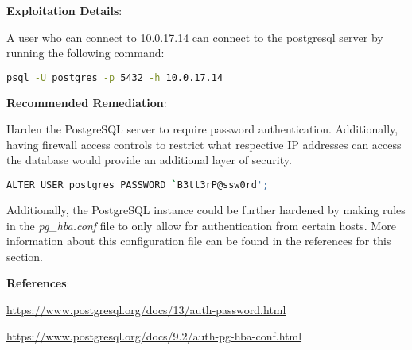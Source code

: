 \noindent
\textbf{Exploitation Details}:
    
    A user who can connect to 10.0.17.14 can connect to the postgresql server by running the following command:
    
\begin{lstlisting}[language=bash,frame=single,showstringspaces=false]
psql -U postgres -p 5432 -h 10.0.17.14
\end{lstlisting}


\noindent
\textbf{Recommended Remediation}:

    Harden the PostgreSQL server to require password authentication. Additionally, having firewall access controls to restrict what respective IP addresses can access the database would provide an additional layer of security.
    
\begin{lstlisting}[language=bash,frame=single,showstringspaces=false]
ALTER USER postgres PASSWORD `B3tt3rP@ssw0rd';
\end{lstlisting}

    Additionally, the PostgreSQL instance could be further hardened by making rules in the \textit{pg\_hba.conf} file to only allow for authentication from certain hosts. More information about this configuration file can be found in the references for this section.

\noindent
\textbf{References}:

    \url{https://www.postgresql.org/docs/13/auth-password.html}
    
    \url{https://www.postgresql.org/docs/9.2/auth-pg-hba-conf.html}


\newpage
